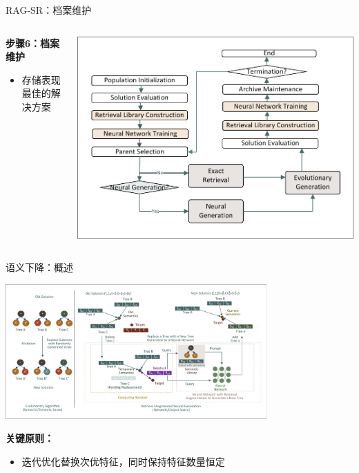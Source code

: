 \documentclass[aspectratio=1610]{beamer}
\begin{document}
    \begin{frame}{RAG-SR：档案维护}
        \begin{columns}
            \begin{column}{0.5\textwidth}
                \textbf{步骤6：档案维护}
                \begin{itemize}
                    \item 存储表现最佳的解决方案
                \end{itemize}
            \end{column}
            \begin{column}{0.5\textwidth}
                \includegraphics[width=1.0\textwidth]{figs/Workflow.pdf}
            \end{column}
        \end{columns}
    \end{frame}

    \begin{frame}{语义下降：概述}
        \begin{center}
            \includegraphics[width=0.75\textwidth, trim=8pt 8pt 8pt 8pt, clip]{figs/Motivation.pdf}
        \end{center}

        \textbf{关键原则：}
        \begin{itemize}
            \item 迭代优化替换次优特征，同时保持特征数量恒定
        \end{itemize}
    \end{frame}
\end{document}
